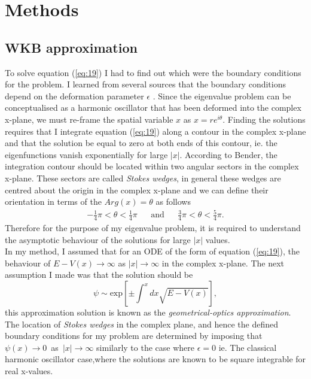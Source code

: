 \documentclass[10pt, a4paper, singlespacing]{report}
\begin{document}
\section{Methods}
\subsection{WKB approximation}\label{WKB}
To solve equation (\ref{eq:19}) I had to find out which were the boundary conditions for the problem. I learned from several sources that the boundary conditions depend on the deformation parameter $\epsilon$ \cite{BenderPT}\cite{Bender}\cite{Bender2017}. Since the eigenvalue problem can be conceptualised as a harmonic oscillator that has been deformed into the complex x-plane, we must re-frame the spatial variable $x$ as $x = r e^{i\theta}$. Finding the solutions requires that I integrate equation (\ref{eq:19}) along a contour in the complex x-plane and that the solution be equal to zero at both ends of this contour\cite{BenderPT}, ie. the eigenfunctions vanish exponentially for large $|x|$. According to Bender, the integration contour should be located within two angular sectors in the complex x-plane. These sectors are called \emph{Stokes wedges}\cite{BenderPT}\cite{Bender}, in general these wedges are centred about the origin in the complex x-plane and we can define their orientation in terms of the $Arg(x) = \theta$ as follows
\begin{align} \label{eq:20}
&-\frac{1}{4} \pi < \theta < \frac{1}{4}\pi& &\mathrm{and}& &\frac{3}{4} \pi < \theta < \frac{5}{4}\pi.& 
\end{align}
Therefore for the purpose of my eigenvalue problem, it is required to understand the asymptotic behaviour of the solutions for large $|x|$ values.\\
In my method, I assumed that for an ODE of the form of equation (\ref{eq:19}), the behaviour of $E - V(x) \rightarrow \infty$ as $|x| \rightarrow \infty$ in the complex x-plane. The next assumption I made was that the solution should be
\begin{equation} \label{eq:21}
\psi \sim \mathrm{exp}[\pm \int^{x}dx \sqrt{E - V(x)}],
\end{equation}
this approximation solution is known as the \emph{geometrical-optics approximation}\cite{BenderPT}.\\ 
The location of \emph{Stokes wedges} in the complex plane, and hence the defined boundary conditions for my problem are determined by imposing that \mbox{$\psi(x) \rightarrow 0$ as $|x| \rightarrow \infty$} similarly to the case where $\epsilon = 0$ ie. The classical harmonic oscillator case,where the solutions are known to be square integrable for real x-values.\\
\end{document}
